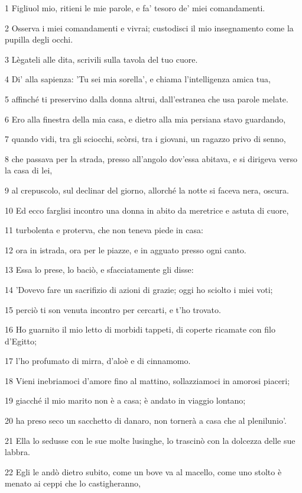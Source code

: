 \par 1 Figliuol mio, ritieni le mie parole, e fa' tesoro de' miei comandamenti.
\par 2 Osserva i miei comandamenti e vivrai; custodisci il mio insegnamento come la pupilla degli occhi.
\par 3 Lègateli alle dita, scrivili sulla tavola del tuo cuore.
\par 4 Di' alla sapienza: 'Tu sei mia sorella', e chiama l'intelligenza amica tua,
\par 5 affinché ti preservino dalla donna altrui, dall'estranea che usa parole melate.
\par 6 Ero alla finestra della mia casa, e dietro alla mia persiana stavo guardando,
\par 7 quando vidi, tra gli sciocchi, scòrsi, tra i giovani, un ragazzo privo di senno,
\par 8 che passava per la strada, presso all'angolo dov'essa abitava, e si dirigeva verso la casa di lei,
\par 9 al crepuscolo, sul declinar del giorno, allorché la notte si faceva nera, oscura.
\par 10 Ed ecco farglisi incontro una donna in abito da meretrice e astuta di cuore,
\par 11 turbolenta e proterva, che non teneva piede in casa:
\par 12 ora in istrada, ora per le piazze, e in agguato presso ogni canto.
\par 13 Essa lo prese, lo baciò, e sfacciatamente gli disse:
\par 14 'Dovevo fare un sacrifizio di azioni di grazie; oggi ho sciolto i miei voti;
\par 15 perciò ti son venuta incontro per cercarti, e t'ho trovato.
\par 16 Ho guarnito il mio letto di morbidi tappeti, di coperte ricamate con filo d'Egitto;
\par 17 l'ho profumato di mirra, d'aloè e di cinnamomo.
\par 18 Vieni inebriamoci d'amore fino al mattino, sollazziamoci in amorosi piaceri;
\par 19 giacché il mio marito non è a casa; è andato in viaggio lontano;
\par 20 ha preso seco un sacchetto di danaro, non tornerà a casa che al plenilunio'.
\par 21 Ella lo sedusse con le sue molte lusinghe, lo trascinò con la dolcezza delle sue labbra.
\par 22 Egli le andò dietro subito, come un bove va al macello, come uno stolto è menato ai ceppi che lo castigheranno,
